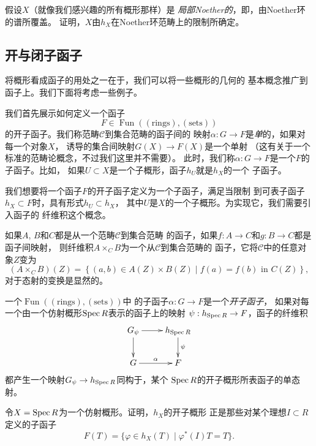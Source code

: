 \begin{exe}
假设$X$（就像我们感兴趣的所有概形那样）是
\textit{局部Noether的}，即，由Noether环的谱所覆盖。
证明，$X$由$h_X$在Noether环范畴上的限制所确定。
\end{exe}


\subsection{开与闭子函子} \label{s:6.1.1}

将概形看成函子的用处之一在于，我们可以将一些概形的几何的
基本概念推广到函子上。我们下面将考虑一些例子。

我们首先展示如何定义一个函子
\[
	F\in \operatorname{Fun}((\text{rings}),(\text{sets}))
\]
的开子函子。我们称范畴$\mathscr C$到集合范畴的函子间的
映射$\alpha:G\to F$是\textit{单}的，如果对每一个对象$X$，
诱导的集合间映射$G(X)\to F(X)$是一个单射
（这有关于一个标准的范畴论概念，不过我们这里并不需要）。
此时，我们称$\alpha:G\to F$是一个$F$的子函子。比如，
如果$U\subset X$是一个子概形，函子$h_U$就是$h_X$的一个
子函子。

我们想要将一个函子$F$的开子函子定义为一个子函子，满足当限制
到可表子函子$h_X\subset F$时，具有形式$h_U\subset h_X$，
其中$U$是$X$的一个子概形。为实现它，我们需要引入函子的
纤维积这个概念。

\begin{defi} \label{defi:6.4}
	如果$A$, $B$和$C$都是从一个范畴$\mathscr C$到集合范畴
	的函子，如果$f:A\to C$和$g:B\to C$都是函子间映射，
	则纤维积$A\times_C B$为一个从$\mathscr C$到集合范畴的
	函子，它将$\mathscr C$中的任意对象$Z$变为
	\[
		(A\times_C B)(Z)=\left\{(a,b)\in A(Z)\times B(Z)
		\;|\; f(a)=f(b)\text{ in } C(Z)\right\},
	\]
	对于态射的变换是显然的。
\end{defi}

\begin{defi} \label{defi:6.5}
一个$\operatorname{Fun}((\text{rings}),(\text{sets}))$中
的子函子$\alpha:G\to F$是一个\textit{开子函子}，
如果对每一个由一个仿射概形$\operatorname{Spec} R$表示的函子上的映射
$\psi:h_{\operatorname{Spec} R}\to F$，函子的纤维积
\[
	\xymatrix{
		G_\psi\ar[r]\ar[d]&h_{\spec R}\ar[d]^\psi\\
		G\ar[r]^\alpha& F
	}
\]
都产生一个映射$G_\psi\to h_{\operatorname{Spec} R}$同构于，某个
$\operatorname{Spec} R$的开子概形所表函子的单态射。
\end{defi}

\begin{exe} \label{exe:6.6}
令$X=\operatorname{Spec} R$为一个仿射概形。证明，$h_X$的开子概形
正是那些对某个理想$I\subset R$定义的子函子
\[
	F(T)=\{\varphi\in h_X(T)\; | \; \varphi^*(I)T=T\}.
\]
\end{exe}


